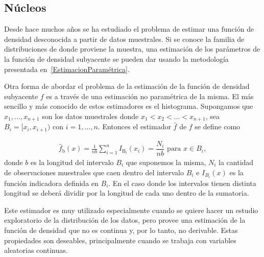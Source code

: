 \subsection{Núcleos}
Desde hace muchos años se ha estudiado el problema de estimar una función de densidad desconocida a partir de datos muestrales. Si se conoce la familia de distribuciones de donde proviene la muestra, una estimación de los parámetros de la función de densidad subyacente se pueden dar usando la metodología presentada en~\ref{EstimacionParamétrica}. 

Otra forma de abordar el problema de la estimación de la función de densidad subyacente $f$ es a través de una estimación no paramétrica de la misma. El más sencillo y más conocido de estos estimadores es el histograma. Supongamos que $x_1,\ldots,x_{n+1}$ son los datos muestrales donde $x_1<x_2<\ldots<x_{n+1}$, sea $B_i=[x_i,x_{i+1}) \text{ con } i=1,\ldots,n.$ Entonces el estimador $\widehat{f}$ de $f$ se define como 

\begin{align}
\widehat{f}_\text{b}(x)=\frac{1}{n b} \sum_{i=1}^n I_{\text{B}_i} (x_i)=\dfrac{N_i}{n b} \text{ para } x \in B_i,
\end{align}
donde $b$ es la longitud del intervalo $B_i$ que suponemos la misma, $N_i$ la cantidad de observaciones muestrales que caen dentro del intervalo $B_i$ e $I_{B_i}(x)$ es la función indicadora definida en $B_i$. En el caso donde los intervalos tienen distinta longitud se deberá dividir por la longitud de cada uno dentro de la sumatoria.

Este estimador es muy utilizado especialmente cuando se quiere hacer un estudio exploratorio de la distribución de los datos, pero provee una estimación de la función de densidad que no es continua y, por lo tanto, no derivable. Estas propiedades son deseables, principalmente cuando se trabaja con variables aleatorias continuas.

